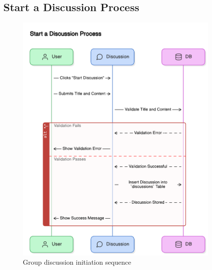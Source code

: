 \subsection{Start a Discussion Process}
\begin{figure}[H]
    \centering
    \includegraphics[width=0.9\textwidth]{latex-doc/images/sequence_diagrams/start_a_discussion_process.png}
    \caption{Group discussion initiation sequence}
    \label{fig:start_discussion}
\end{figure}

